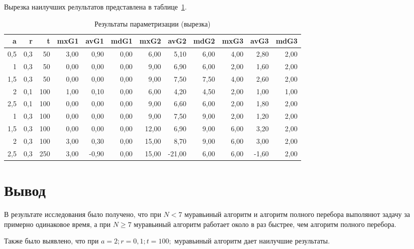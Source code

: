 Вырезка наилучших релультатов представлена в таблице~\ref{tbl:cut}.

\begin{table}[h]
\centering
\caption{Результаты параметризации (вырезка)}
\label{tbl:cut}
\begin{tabular}{|r|r|r|r|r|r|r|r|r|r|r|r|}
\hline
a & r & t & mxG1 & avG1 & mdG1 & mxG2 & avG2 & mdG2 & mxG3 & avG3 & mdG3 \\
\hline
0,5 & 0,3 & 50 & 3,00 & 0,90 & 0,00 & 6,00 & 5,10 & 6,00 & 4,00 & 2,80 & 2,00 \\
1 & 0,3 & 50 & 0,00 & 0,00 & 0,00 & 9,00 & 6,90 & 6,00 & 2,00 & 1,60 & 2,00 \\
1,5 & 0,3 & 50 & 0,00 & 0,00 & 0,00 & 9,00 & 7,50 & 7,50 & 4,00 & 2,60 & 2,00 \\
2 & 0,1 & 100 & 1,00 & 0,10 & 0,00 & 6,00 & 4,20 & 4,50 & 2,00 & 1,00 & 1,00 \\
2,5 & 0,1 & 100 & 0,00 & 0,00 & 0,00 & 9,00 & 6,60 & 6,00 & 2,00 & 1,80 & 2,00 \\
1 & 0,3 & 100 & 0,00 & 0,00 & 0,00 & 9,00 & 7,50 & 9,00 & 2,00 & 1,20 & 2,00 \\
1,5 & 0,3 & 100 & 0,00 & 0,00 & 0,00 & 12,00 & 6,90 & 9,00 & 6,00 & 3,20 & 2,00 \\
2 & 0,3 & 100 & 3,00 & 0,30 & 0,00 & 15,00 & 8,70 & 9,00 & 6,00 & 3,00 & 2,00 \\
2,5 & 0,3 & 250 & 3,00 & -0,90 & 0,00 & 15,00 & -21,00 & 6,00 & 6,00 & -1,60 & 2,00 \\
\hline
\end{tabular}
\end{table}

\clearpage

\section{Вывод}

В результате исследования было получено, что при $N < 7$ муравьиный алгоритм и алгоритм полного перебора выполянют задачу за примерно одинаковое время, а при $N\ge 7$ муравьиный алгоритм работает около в  раз быстрее, чем алгоритм полного перебора.

Также было выявлено, что при $a=2;r=0,1;t=100;$ муравьиный алгоритм дает наилучшие результаты.